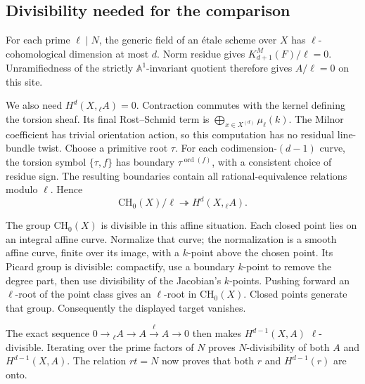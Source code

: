 \documentclass[10pt]{article}
\begin{document}
\subsection*{Divisibility needed for the comparison}
For each prime \(\ell\mid N\), the generic field of an étale scheme over \(X\) has \(\ell\)-cohomological dimension at most \(d\). Norm residue gives \(K_{d+1}^M(F)/\ell=0\). Unramifiedness of the strictly \(\mathbb A^1\)-invariant quotient therefore gives \(A/\ell=0\) on this site.\par
We also need \(H^d(X,{}_\ell A)=0\). Contraction commutes with the kernel defining the torsion sheaf. Its final Rost–Schmid term is \(\bigoplus_{x\in X^{(d)}}\mu_\ell(k)\). The Milnor coefficient has trivial orientation action, so this computation has no residual line-bundle twist. Choose a primitive root \(\tau\). For each codimension-\((d-1)\) curve, the torsion symbol \(\{\tau,f\}\) has boundary \(\tau^{\operatorname{ord}(f)}\), with a consistent choice of residue sign. The resulting boundaries contain all rational-equivalence relations modulo \(\ell\). Hence \[\mathrm{CH}_0(X)/\ell\twoheadrightarrow H^d(X,{}_\ell A).\]\par
The group \(\mathrm{CH}_0(X)\) is divisible in this affine situation. Each closed point lies on an integral affine curve. Normalize that curve; the normalization is a smooth affine curve, finite over its image, with a \(k\)-point above the chosen point. Its Picard group is divisible: compactify, use a boundary \(k\)-point to remove the degree part, then use divisibility of the Jacobian’s \(k\)-points. Pushing forward an \(\ell\)-root of the point class gives an \(\ell\)-root in \(\mathrm{CH}_0(X)\). Closed points generate that group. Consequently the displayed target vanishes.\par
The exact sequence \(0\to{}_\ell A\to A\xrightarrow{\ell}A\to0\) then makes \(H^{d-1}(X,A)\) \(\ell\)-divisible. Iterating over the prime factors of \(N\) proves \(N\)-divisibility of both \(A\) and \(H^{d-1}(X,A)\). The relation \(rt=N\) now proves that both \(r\) and \(H^{d-1}(r)\) are onto.\par
\end{document}

